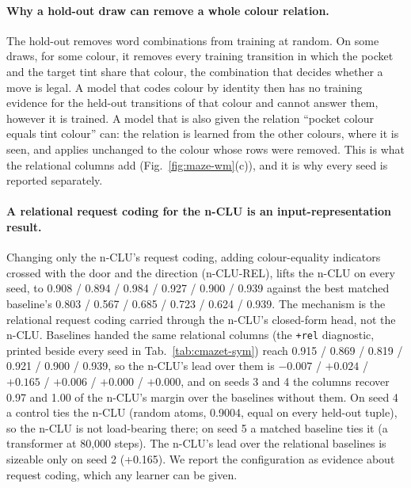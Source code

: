 \documentclass{article} %
\begin{document}
\paragraph{Why a hold-out draw can remove a whole colour relation.} The hold-out removes word
combinations from training at random. On some draws, for some colour, it removes every training
transition in which the pocket and the target tint share that colour, the combination that decides
whether a move is legal. A model that codes colour by identity then has no training evidence for the
held-out transitions of that colour and cannot answer them, however it is trained. A model that is
also given the relation ``pocket colour equals tint colour'' can: the relation is learned from the
other colours, where it is seen, and applies unchanged to the colour whose rows were removed. This is
what the relational columns add (Fig.~\ref{fig:maze-wm}(c)), and it is why every seed is reported
separately.

\paragraph{A relational request coding for the n-CLU is an input-representation result.} Changing only the
n-CLU's request coding, adding colour-equality indicators crossed with the door and the direction
(n-CLU-REL), lifts the n-CLU on every seed, to 0.908 / 0.894 / 0.984 / 0.927 / 0.900 / 0.939
against the best matched baseline's 0.803 / 0.567 / 0.685 / 0.723 / 0.624 / 0.939. The mechanism is the
relational request coding carried through the n-CLU's closed-form head, not the n-CLU. Baselines handed
the same relational columns (the \texttt{+rel} diagnostic, printed beside every seed in
Tab.~\ref{tab:cmazet-sym}) reach 0.915 / 0.869 / 0.819 / 0.921 / 0.900 / 0.939, so the n-CLU's lead
over them is $-0.007$ / $+0.024$ / $+0.165$ / $+0.006$ / $+0.000$ / $+0.000$, and on seeds 3 and 4 the
columns recover 0.97 and 1.00 of the n-CLU's margin over the baselines without them. On seed 4 a control
ties the n-CLU (random atoms, 0.9004, equal on every held-out tuple), so the n-CLU is not load-bearing
there; on seed 5 a matched baseline ties it (a transformer at 80,000 steps). The n-CLU's lead over the
relational baselines is sizeable only on seed 2 (+0.165). We report the configuration as evidence about
request coding, which any learner can be given.
\end{document}
